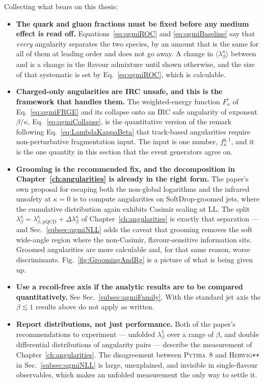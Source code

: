 Collecting what bears on this thesis:

\begin{itemize}
	\item \textbf{The quark and gluon fractions must be fixed before any
	medium effect is read off.} Equations~\ref{eq:qgmiROC} and \ref{eq:qgmiBaseline}
	say that \emph{every} angularity separates the two species, by an amount that is
	the same for all of them at leading order and does not go away. A change in
	\(\langle\lambda^\kappa_\beta\rangle\) between \pp and \AuAu is a change in the
	flavour admixture until shown otherwise, and the size of that systematic is set by
	Eq.~\ref{eq:qgmiROC}, which is calculable.

	\item \textbf{Charged-only angularities are IRC unsafe, and this is the
	framework that handles them.} The weighted-energy function
	\(F^i_\kappa\) of Eq.~\ref{eq:qgmiFRGE} and its collapse onto an IRC safe
	angularity of exponent \(\beta/\kappa\), Eq.~\ref{eq:qgmiCollapse}, is the
	quantitative version of the remark following Eq.~\ref{eq:LambdaKappaBeta} that
	track-based angularities require non-perturbative fragmentation input. The input
	is one number, \(f^{g,1}_\kappa\), and it is the one quantity in this section that
	the event generators agree on.

	\item \textbf{Grooming is the recommended fix, and the decomposition in
	Chapter~\ref{ch:angularities} is already in the right form.} The paper's own
	proposal for escaping both the non-global logarithms and the infrared unsafety at
	\(\kappa=0\) is to compute angularities on SoftDrop-groomed jets, where the
	cumulative distribution again exhibits Casimir scaling at LL. The split
	\(\lambda^\kappa_\beta = \lambda^\kappa_{\beta,\mathrm{pQCD}}
	+ \Delta\lambda^\kappa_\beta\) of Chapter~\ref{ch:angularities} is exactly that
	separation --- and Sec.~\ref{subsec:qgmiNLL} adds the caveat that grooming removes
	the soft wide-angle region where the non-Casimir, flavour-sensitive information
	sits. Groomed angularities are more calculable and, for that same reason, worse
	discriminants. Fig.~\ref{fig:GroomingAndRg} is a picture of what is being given up.

	\item \textbf{Use a recoil-free axis if the analytic results are to be
	compared quantitatively.} See Sec.~\ref{subsec:qgmiFamily}. With the standard jet
	axis the \(\beta\lesssim1\) results above do not apply as written.

	\item \textbf{Report distributions, not just performance.} Both of the paper's
	recommendations to experiment --- unfolded \(\lambda^1_\beta\) over a range of
	\(\beta\), and double differential distributions of angularity pairs --- describe
	the \pp measurement of Chapter~\ref{ch:angularities}. The disagreement between
	\textsc{Pythia}~8 and \textsc{Herwig}\texttt{++} in Sec.~\ref{subsec:qgmiNLL} is large, unexplained, and
	invisible in single-flavour observables, which makes an unfolded measurement the
	only way to settle it.
\end{itemize}
